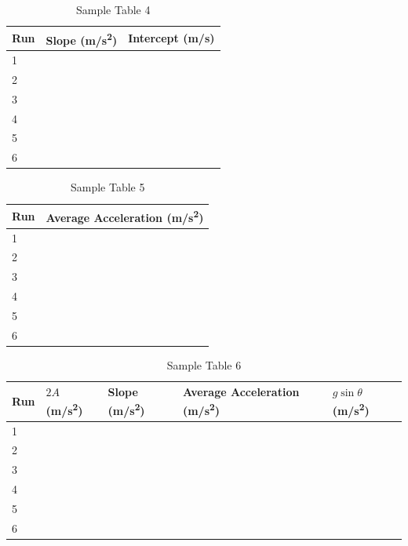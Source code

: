 %
\begin{table}[ht!]
    \begin{center}
        \begin{tabular}{l | l | l}
            \textbf{Run} & \textbf{Slope} (m/s\textsuperscript{2}) & \textbf{Intercept} (m/s) \\
            \hline
            1 & & \\
            2 & & \\
            3 & & \\
            \hline
            4 & & \\
            5 & & \\
            6 & & \\
            \hline
        \end{tabular}
    \end{center}
    \caption{Sample Table 4}
\end{table}
%
\begin{table}[ht!]
    \begin{center}
        \begin{tabular}{l | l}
            \textbf{Run} & \textbf{Average Acceleration} (m/s\textsuperscript{2}) \\
            \hline
            1 & \\
            2 & \\
            3 & \\
            \hline
            4 & \\
            5 & \\
            6 & \\
            \hline
        \end{tabular}
    \end{center}
    \caption{Sample Table 5}
\end{table}
%
\begin{table}[ht!]
    \begin{center}
        \begin{tabular}{l | l | l | l | l}
            \textbf{Run} & $2A$ (m/s\textsuperscript{2}) & \textbf{Slope} (m/s\textsuperscript{2}) & \textbf{Average Acceleration} (m/s\textsuperscript{2}) & $g \sin \theta$ (m/s\textsuperscript{2}) \\
            \hline
            1 & & & & \\
            2 & & & & \\
            3 & & & & \\
            \hline
            4 & & & & \\
            5 & & & & \\
            6 & & & & \\
            \hline
        \end{tabular}
        \caption{Sample Table 6}
    \end{center}
\end{table}
